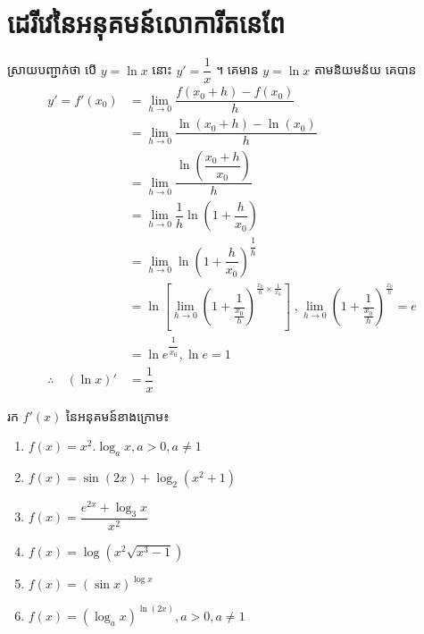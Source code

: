 \documentclass[a4paper,12pt]{article}
\begin{document}
\section{ដេរីវេនៃអនុគមន៍លោការីតនេពែ}
ស្រាយបញ្ជាក់ថា បើ $y=\ln x$ នោះ $y'=\dfrac{1}{x}$ ។
\solution
គេមាន $y=\ln x$ តាមនិយមន័យ គេបាន
\begin{align*}
	y'=f'(x_0)                & =\lim_{h\to 0}\dfrac{f(x_0+h)-f(x_0)}{h}                                                                                                                                                 \\
	                          & =\lim_{h\to 0}\dfrac{\ln (x_0+h)-\ln (x_0)}{h}                                                                                                                                           \\
	                          & =\lim_{h\to 0}\dfrac{\ln \left(\dfrac{x_0+h}{x_0} \right)}{h}                                                                                                                            \\
	                          & =\lim_{h\to 0}\dfrac{1}{h}\ln \left(1+\dfrac{h}{x_0} \right)                                                                                                                             \\
	                          & =\lim_{h\to 0}\ln \left(1+\dfrac{h}{x_0}\right)^{\dfrac{1}{h}}                                                                                                                           \\
	                          & =\ln \left[\lim_{h\to 0}\left(1+\dfrac{1}{\frac{x_0}{h}} \right)^{\frac{x_0}{h}\times \frac{1}{x_0}}  \right]\;, \lim_{h\to 0}\left(1+\dfrac{1}{\frac{x_0}{h}} \right)^{\frac{x_0}{h}}=e \\
	                          & =\ln e^{\dfrac{1}{x_0}},\ln e=1                                                                                                                                                          \\
	\therefore \quad (\ln x)' & =\dfrac{1}{x}
\end{align*}
\begin{example}
	រក $f'(x)$ នៃអនុគមន៍ខាងក្រោម៖
	\begin{multicols}{2}
		\begin{enumerate}
			\item $f(x)=x^2.\log_a x, a>0,a\neq 1$
			\item $f(x)=\sin (2x)+\log_2 (x^2+1)$
			\item $f(x)=\dfrac{e^{2x}+\log_3 x}{x^2}$
			\item $f(x)=\log (x^2 \sqrt{x^3-1})$
			\item $f(x)=(\sin x)^{\log x}$
			\item $f(x)=(\log _a x)^{\ln (2x)},a>0,a\neq 1$
		\end{enumerate}
	\end{multicols}
\end{example}
\end{document}
